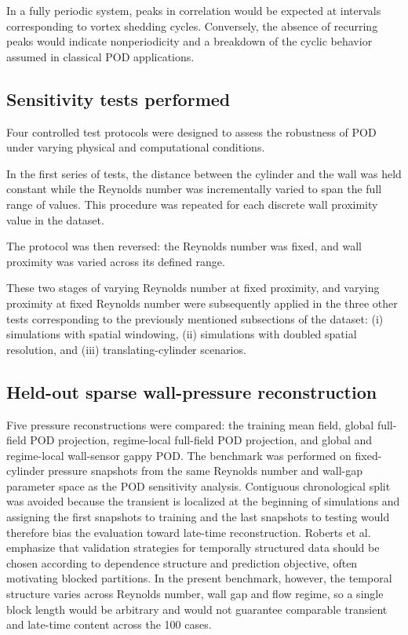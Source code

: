 \documentclass[preprint,12pt]{elsarticle}
\begin{document}
In a fully periodic system, peaks in correlation would be expected at intervals corresponding to vortex shedding cycles. Conversely, the absence of recurring peaks would indicate nonperiodicity and a breakdown of the cyclic behavior assumed in classical POD applications.

\subsection{Sensitivity tests performed}
\label{subsec3.5}
Four controlled test protocols were designed to assess the robustness of POD under varying physical and computational conditions.

In the first series of tests, the distance between the cylinder and the wall was held constant while the Reynolds number was incrementally varied to span the full range of values. This procedure was repeated for each discrete wall proximity value in the dataset.

The protocol was then reversed: the Reynolds number was fixed, and wall proximity was varied across its defined range.

These two stages of varying Reynolds number at fixed proximity, and varying proximity at fixed Reynolds number were subsequently applied in the three other tests corresponding to the previously mentioned subsections of the dataset: (i) simulations with spatial windowing, (ii) simulations with doubled spatial resolution, and (iii) translating-cylinder scenarios. 

\subsection{Held-out sparse wall-pressure reconstruction}
\label{subsec3.3}
Five pressure reconstructions were compared: the training mean field, global full-field POD projection, regime-local full-field POD projection, and global and regime-local wall-sensor gappy POD. The benchmark was performed on fixed-cylinder pressure snapshots from the same Reynolds number and wall-gap parameter space as the POD sensitivity analysis. Contiguous chronological split was avoided because the transient is localized at the beginning of simulations and assigning the first snapshots to training and the last snapshots to testing would therefore bias the evaluation toward late-time reconstruction. Roberts et al.~\citep{Roberts2017} emphasize that validation strategies for temporally structured data should be chosen according to dependence structure and prediction objective, often motivating blocked partitions. In the present benchmark, however, the temporal structure varies across Reynolds number, wall gap and flow regime, so a single block length would be arbitrary and would not guarantee comparable transient and late-time content across the 100 cases. 
\end{document}
